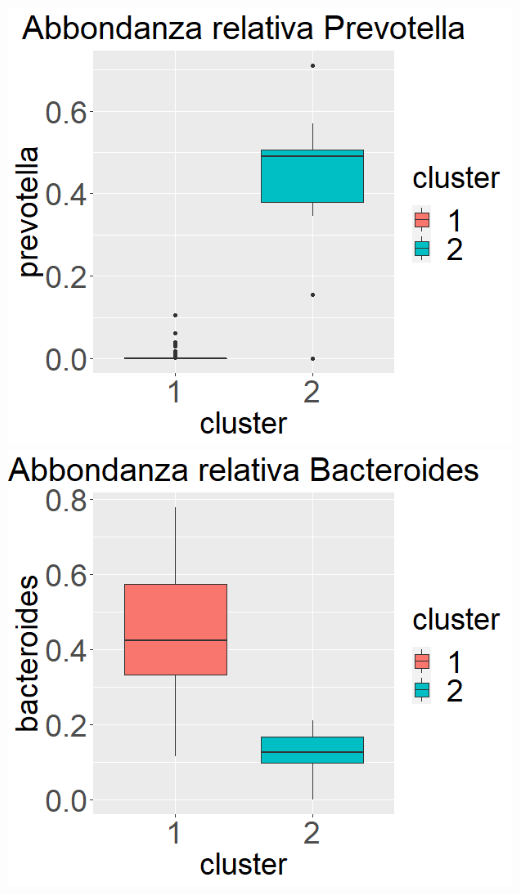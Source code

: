\begin{Figure}
	\begin{multicols}{3}
    \centering
    \includegraphics[width=\linewidth,keepaspectratio]{images/real_prevotella.png}
        \includegraphics[width=\linewidth,keepaspectratio]{images/real_bacteroides.png}

\end{multicols}
\end{Figure}
